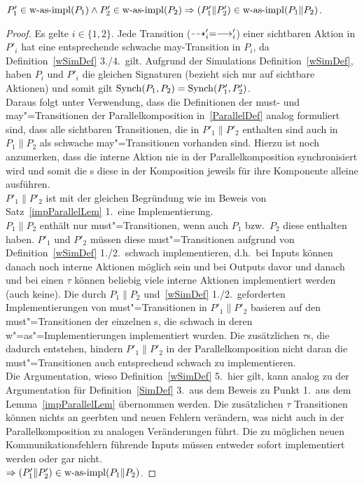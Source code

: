 \begin{Lem}\mbox{}


  $P'_1\in\mathrm{w}\text{-}\mathrm{as}\text{-}\mathrm{impl} (P_1) \land P'_2 \in\mathrm{w}\text{-}\mathrm{as}\text{-}\mathrm{impl} (P_2) \Rightarrow (P'_1\|P'_2)
  \in\mathrm{w}\text{-}\mathrm{as}\text{-}\mathrm{impl} (P_1\|P_2)$.
\end{Lem}

\begin{proof}\mbox{}
    Es gelte $i\in\{1,2\}$. Jede Transition ($\may '_i =\must '_i$) einer
    sichtbaren Aktion in $P'_i$ hat eine entsprechende schwache
    may-Transition in $P_i$, da Definition~\ref{wSimDef} 3./4.\ gilt. Aufgrund
    der Simulations Definition~\ref{wSimDef}, haben $P_i$ und $P'_i$ die
    gleichen Signaturen (bezieht sich nur auf sichtbare Aktionen) und somit
    gilt $\mathrm{Synch} (P_1,P_2) = \mathrm{Synch} (P'_1,P'_2)$.\\
    Daraus folgt unter Verwendung, dass die Definitionen der must- und
    may"=Transitionen der Parallelkomposition in~\ref{ParallelDef} analog
    formuliert sind, dass alle sichtbaren Transitionen, die in $P'_1\|P'_2$
    enthalten sind auch in $P_1\|P_2$ als schwache may"=Transitionen
    vorhanden sind. Hierzu ist noch anzumerken, dass die interne Aktion nie
    in der Parallelkomposition synchronisiert wird und somit die \MEIO{}s
    diese in der Komposition jeweils für ihre Komponente alleine ausführen.\\
    $P'_1\|P'_2$ ist mit der gleichen Begründung wie im Beweis von
    Satz~\ref{impParallelLem} 1.\ eine Implementierung.\\
    $P_1\|P_2$ enthält nur must"=Transitionen, wenn auch $P_1$ bzw.\ $P_2$
    diese enthalten haben. $P'_1$ und $P'_2$ müssen diese must"=Transitionen
    aufgrund von Definition~\ref{wSimDef} 1./2.\ schwach implementieren, d.h.\
    bei Inputs können danach noch interne Aktionen möglich sein und bei
    Outputs davor und danach und bei einen $\tau$ können beliebig viele
    interne Aktionen implementiert werden (auch keine). Die durch $P_1\|P_2$
    und~\ref{wSimDef} 1./2.\ geforderten Implementierungen von must"=Transitionen
    in $P'_1\|P'_2$ basieren auf den must"=Transitionen der einzelnen
    \MEIO{}s, die schwach in deren w"=as"=Implementierungen implementiert
    wurden. Die zusätzlichen $\tau$s, die dadurch entstehen, hindern
    $P'_1\|P'_2$ in der Parallelkomposition nicht daran die
    must"=Transitionen auch entsprechend schwach zu implementieren.\\
    Die Argumentation, wieso Definition~\ref{wSimDef} 5.\ hier gilt, kann
    analog zu der Argumentation für Definition~\ref{SimDef} 3.\ aus dem
    Beweis zu Punkt 1.\ aus dem Lemma~\ref{impParallelLem} übernommen werden.
    Die zusätzlichen $\tau$ Transitionen können nichts an geerbten und neuen
    Fehlern verändern, was nicht auch in der
    Parallelkomposition zu analogen Veränderungen führt. Die zu möglichen
    neuen Kommunikationsfehlern führende Inputs müssen entweder sofort
    implementiert werden oder gar nicht.\\
    $\Rightarrow (P'_1\|P'_2)\in\mathrm{w}\text{-}\mathrm{as}\text{-}\mathrm{impl} (P_1\|P_2)$.
\end{proof}

